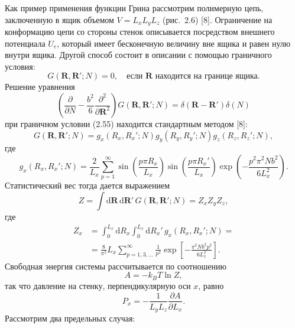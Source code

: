 \documentclass[12pt,a4paper]{article}
\begin{document}
Как пример применения функции Грина рассмотрим полимерную цепь, заключенную в ящик объемом $V = L_x L_y L_z$ (рис.~2.6) [8]. Ограничение на конформацию цепи со стороны стенок описывается посредством внешнего потенциала $U_e$, который имеет бесконечную величину вне ящика и равен нулю внутри ящика. Другой способ состоит в описании с помощью граничного условия:
\begin{equation}
G(\boldsymbol{R}, \boldsymbol{R}'; N) = 0, \quad \text{если $\boldsymbol{R}$ находится на границе ящика.} \tag{2.55}
\end{equation}
Решение уравнения
\begin{equation}
\left(\frac{\partial}{\partial N} - \frac{b^2}{6}\frac{\partial^2}{\partial\boldsymbol{R}^2}\right)G(\boldsymbol{R}, \boldsymbol{R}'; N) = \delta(\boldsymbol{R} - \boldsymbol{R}')\delta(N) \tag{2.56}
\end{equation}
при граничном условии (2.55) находится стандартным методом [8]:
\begin{equation}
G(\boldsymbol{R}, \boldsymbol{R}'; N) = g_x(R_x, R_x'; N)g_y(R_y, R_y'; N)g_z(R_z, R_z'; N), \tag{2.57}
\end{equation}
где
\begin{equation}
g_x(R_x, R_x'; N) = \frac{2}{L_x}\sum_{p=1}^\infty \sin\left(\frac{p\pi R_x}{L_x}\right)\sin\left(\frac{p\pi R_x'}{L_x}\right)\exp\left(-\frac{p^2\pi^2 Nb^2}{6L_x^2}\right). \tag{2.58}
\end{equation}
Статистический вес тогда дается выражением
\begin{equation}
Z = \int\!\mathrm{d}\boldsymbol{R}\,\mathrm{d}\boldsymbol{R}'\,G(\boldsymbol{R}, \boldsymbol{R}'; N) = Z_x Z_y Z_z, \tag{2.59}
\end{equation}
где
\begin{align}
Z_x &= \int_0^{L_x}\!\mathrm{d}R_x\int_0^{L_x}\!\mathrm{d}R_x'\,g_x(R_x, R_x'; N) = \nonumber\\
&= \frac{8}{\pi^2}L_x\sum_{p=1,3,\dots}^\infty \frac{1}{p^2}\exp\left[-\frac{\pi^2 Nb^2 p^2}{6L_x^2}\right]. \tag{2.60}
\end{align}
Свободная энергия системы рассчитывается по соотношению
\begin{equation}
A = -k_B T \ln Z, \tag{2.61}
\end{equation}
так что давление на стенку, перпендикулярную оси $x$, равно
\begin{equation}
P_x = -\frac{1}{L_y L_z}\frac{\partial A}{\partial L_x}. \tag{2.62}
\end{equation}
Рассмотрим два предельных случая:
\end{document}
